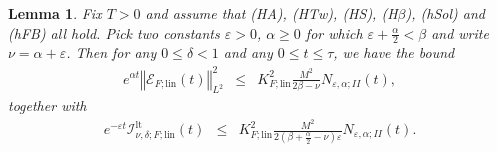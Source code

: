 \documentclass[10pt]{articleHJ}
\newcommand{\e}{\ensuremath{\varepsilon}}
\newcommand{\norm}[1]{\left\Vert#1\right\Vert}		%
\newtheorem{lem}[thm]{Lemma}
\numberwithin{equation}{section}
\begin{document}
\begin{lem}
Fix $T > 0$ and assume that (HA), (HTw), (HS), (H$\beta$),
(hSol) and (hFB) all hold.
Pick two constants $\e > 0$, $\alpha \ge 0$
for which $ \e + \frac{\alpha}{2} < \beta$
and write $\nu = \alpha + \e$.
Then for any
$0 \le \delta < 1$
and any $0 \le t \le \tau$,
we have the bound
\begin{equation}
\begin{array}{lcl}
e^{\alpha t} \norm{\mathcal{E}_{F;\mathrm{lin}}(t)}_{L^2}^2
 & \le &  K_{F;\mathrm{lin}}^2 \frac{M^2}{2 \beta - \nu} N_{\e,\alpha;II}(t),
\end{array}
\end{equation}
together with
\begin{equation}
\begin{array}{lcl}
 e^{-\e t} \mathcal{I}^{\mathrm{lt}}_{\nu,\delta;F;\mathrm{lin}}(t)
 & \le &
  K_{F;\mathrm{lin}}^2 \frac{M^2}{2(\beta  + \frac{\alpha}{2} - \nu)
    \e} N_{\e, \alpha;II}(t).
\end{array}
\end{equation}
\end{lem}
\end{document}

